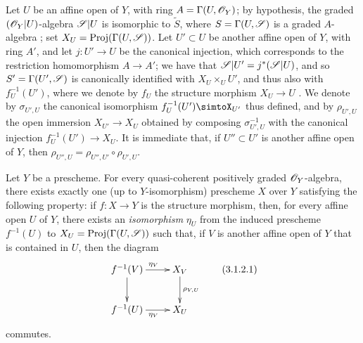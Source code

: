 \begin{env}[3.1.1]
Let $U$ be an affine open of $Y$, with ring $A=\Gamma(U,\mathscr{O}_Y)$;
by hypothesis, the graded $(\mathscr{O}_Y|U)$-algebra $\mathscr{S}|U$ is isomorphic to $\widetilde{S}$, where $S=\Gamma(U,\mathscr{S})$ is a graded $A$-algebra ;
set $X_U=\operatorname{Proj}(\Gamma(U,\mathscr{S}))$.
Let $U'\subset U$ be another affine open of $Y$, with ring $A'$, and let $j:U'\to U$ be the canonical injection, which corresponds to the restriction homomorphism $A\to A'$;
we have that $\mathscr{S}|U'=j^*(\mathscr{S}|U)$, and so $S'=\Gamma(U',\mathscr{S})$ is canonically identified with $X_U\times_U U'$, and thus also with $f_U^{-1}(U')$, where we denote by $f_U$ the structure morphism $X_U\to U$ .
We denote by $\sigma_{U',U}$ the canonical isomorphism $f_U^{-1}(U')\simtoX_{U'}$ thus defined, and by $\rho_{U',U}$ the open immersion $X_{U'}\to X_U$ obtained by composing $\sigma_{U',U}^{-1}$ with the canonical injection $f_U^{-1}(U')\to X_U$.
It is immediate that, if $U''\subset U'$ is another affine open of $Y$, then $\rho_{U'',U}=\rho_{U'',U'}\circ\rho_{U',U}$.
\end{env}

\begin{proposition}[3.1.2]
\label{II.3.1.2}
Let $Y$ be a prescheme.
For every quasi-coherent positively graded $\mathscr{O}_Y$-algebra, there exists exactly one (up to $Y$-isomorphism) prescheme $X$ over $Y$ satisfying the following property:
if $f:X\to Y$ is the structure morphism, then, for every affine open $U$ of $Y$, there exists an \emph{isomorphism} $\eta_U$ from the induced prescheme $f^{-1}(U)$ to $X_U=\operatorname{Proj}(\Gamma(U,\mathscr{S}))$ such that, if $V$ is another affine open of $Y$ that is contained in $U$, then the diagram
\[
\label{II.3.1.2.1}
  \xymatrix{
    f^{-1}(V) \ar[r]^{\eta_V} \ar[d]
    & X_V \ar[d]^{\rho_{V,U}}
  \\f^{-1}(U) \ar[r]_{\eta_V}
    & X_U
  }
\tag{3.1.2.1}
\]
commutes.
\end{proposition}

